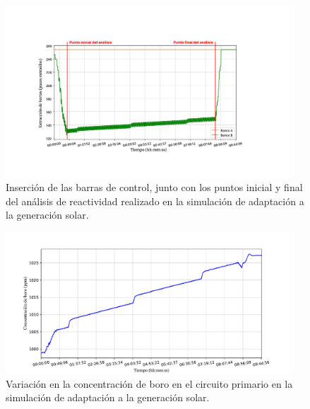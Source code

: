 \begin{figure}[!h]
  \centering
  \includegraphics[width=0.95\textwidth]{content/figures/sim3_barras_control.pdf}
  \caption{Inserción de las barras de control, junto con los puntos inicial y final del análisis de reactividad realizado en la simulación de adaptación a la generación solar.}
  \label{fig:sim3_barras_control}
\end{figure}

\begin{figure}[!h]
  \centering
  \includegraphics[width=0.95\textwidth]{content/figures/sim3_boro.pdf}
  \caption{Variación en la concentración de boro en el circuito primario en la simulación de adaptación a la generación solar.}
  \label{fig:sim3_boro}
\end{figure}

